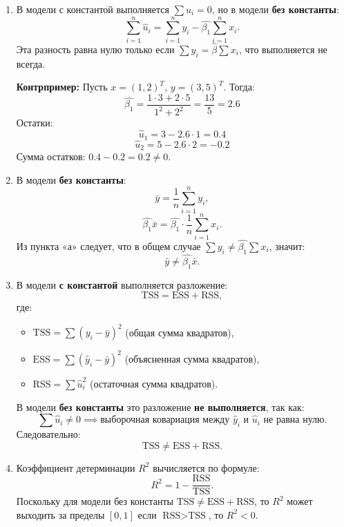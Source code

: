 \documentclass[12pt]{article}
\begin{document}
\begin{sol}
\begin{enumerate}
    \item В модели с константой выполняется $\sum \hat{u}_i = 0$, но в модели \textbf{без константы}:
    \[ \sum_{i=1}^n \hat{u}_i = \sum_{i=1}^n y_i - \hat{\beta_1} \sum_{i=1}^n x_i. \]
    Эта разность равна нулю только если $\sum y_i = \hat{\beta} \sum x_i$, что выполняется не всегда.

    \textbf{Контрпример:}
    Пусть $x = (1, 2)^T$, $y = (3, 5)^T$. Тогда:
    \[ \hat{\beta_1} = \frac{1 \cdot 3 + 2 \cdot 5}{1^2 + 2^2} = \frac{13}{5} = 2.6 \]
    Остатки:
    \[ \hat{u}_1 = 3 - 2.6 \cdot 1 = 0.4 \]
    \[ \hat{u}_2 = 5 - 2.6 \cdot 2 = -0.2 \]
    Сумма остатков: $0.4 - 0.2 = 0.2 \neq 0$.

    \item В модели \textbf{без константы}:
    \[ \bar{y} = \frac{1}{n} \sum_{i=1}^n y_i, \]
    \[ \hat{\beta_1} \bar{x} = \hat{\beta_1} \cdot \frac{1}{n} \sum_{i=1}^n x_i. \]
    Из пункта «а» следует, что в общем случае $\sum y_i \neq \hat{\beta_1} \sum x_i$, значит:
    \[ \bar{y} \neq \hat{\beta_1} \bar{x}. \]

    \item В модели \textbf{с константой} выполняется разложение:
    \[ \text{TSS} = \text{ESS} + \text{RSS}, \]
    где:
    \begin{itemize}
        \item $\text{TSS} = \sum (y_i - \bar{y})^2$ (общая сумма квадратов),
        \item $\text{ESS} = \sum (\hat{y}_i - \bar{y})^2$ (объясненная сумма квадратов),
        \item $\text{RSS} = \sum \hat{u}_i^2$ (остаточная сумма квадратов).
    \end{itemize}

    В модели \textbf{без константы} это разложение \textbf{не выполняется}, так как:
    \[ \sum \hat{u}_i \neq 0 \implies \text{выборочная ковариация между } \hat{y}_i \text{ и } \hat{u}_i \text{ не равна нулю}. \]
    Следовательно:
    \[ \text{TSS} \neq \text{ESS} + \text{RSS}. \]

    \item Коэффициент детерминации $R^2$ вычисляется по формуле:
    \[
    R^2 = 1 - \frac{\text{RSS}}{\text{TSS}}.
    \]
    Поскольку для модели без константы $\text{TSS} \neq \text{ESS} + \text{RSS}$, то $R^2$ может выходить за пределы $[0, 1]$ если $\text{RSS} > \text{TSS}$, то $R^2 < 0$.
\end{enumerate}
\end{sol}
\end{document}
